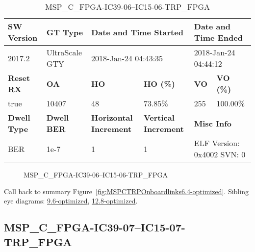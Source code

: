 \begin{table}[h]
\centering
\caption{MSP\_C\_FPGA-IC39-06--IC15-06-TRP\_FPGA}
\label{tab:MSPCFPGAIC3906IC1506TRPFPGA6.4-optimized}
\begin{tabular}{@{}|l|l|l|l|l|l|@{}}
\toprule
\textbf{SW Version}                & \textbf{GT Type}   & \multicolumn{2}{l|}{\textbf{Date and Time Started}}            & \multicolumn{2}{l|}{\textbf{Date and Time Ended}}        \\ \midrule
2017.2                       & UltraScale GTY          & \multicolumn{2}{l|}{2018-Jan-24 04:43:35}                   & \multicolumn{2}{l|}{2018-Jan-24 04:44:12}               \\ \midrule
\textbf{Reset RX}                  & \textbf{OA} & \textbf{HO}   & \textbf{HO (\%)} & \textbf{VO} & \textbf{VO (\%)} \\ \midrule
true & 10407        & 48          & 73.85\%        & 255        & 100.00\%       \\ \midrule
\textbf{Dwell Type}                & \textbf{Dwell BER} & \textbf{Horizontal Increment} & \textbf{Vertical Increment}    & \multicolumn{2}{l|}{\textbf{Misc Info}}                  \\ \midrule
BER                            & 1e-7        & 1        & 1           & \multicolumn{2}{l|}{ELF Version: 0x4002 SVN: 0}                         \\ \bottomrule
\end{tabular}
\end{table}

\begin{figure}[h]
\caption{MSP\_C\_FPGA-IC39-06--IC15-06-TRP\_FPGA} \label{fig:MSPCFPGAIC3906IC1506TRPFPGA6.4-optimized}
\end{figure}

Call back to summary Figure~\ref{fig:MSPCTRPOnboardlinks6.4-optimized}.
Sibling eye diagrams: \hyperref[sec:MSPCFPGAIC3906IC1506TRPFPGA9.6-optimized]{9.6-optimized}, \hyperref[sec:MSPCFPGAIC3906IC1506TRPFPGA12.8-optimized]{12.8-optimized}.

\clearpage
\newpage


\subsection{MSP\_C\_FPGA-IC39-07--IC15-07-TRP\_FPGA}\label{sec:MSPCFPGAIC3907IC1507TRPFPGA6.4-optimized}

